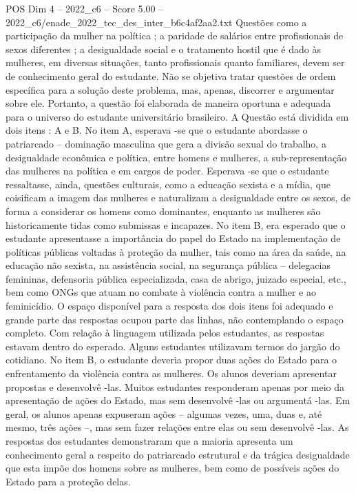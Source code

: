 \begin{textsample}{POS Dim 4 – 2022\_c6 – Score 5.00 – 2022\_c6/enade\_2022\_tec\_des\_inter\_b6c4af2aa2.txt}
Questões como a participação da mulher na política ; a paridade de salários entre profissionais de sexos diferentes ; a desigualdade social e o tratamento hostil que é dado às mulheres, em diversas situações, tanto profissionais quanto familiares, devem ser de conhecimento geral do estudante.
Não se objetiva tratar questões de ordem específica para a solução deste problema, mas, apenas, discorrer e argumentar sobre ele.
Portanto, a questão foi elaborada de maneira oportuna e adequada para o universo do estudante universitário brasileiro.
A Questão está dividida em dois itens : A e B.
No item A, esperava -se que o estudante abordasse o patriarcado – dominação masculina que gera a divisão sexual do trabalho, a desigualdade econômica e política, entre homens e mulheres, a sub-representação das mulheres na política e em cargos de poder.
Esperava -se que o estudante ressaltasse, ainda, questões culturais, como a educação sexista e a mídia, que coisificam a imagem das mulheres e naturalizam a desigualdade entre os sexos, de forma a considerar os homens como dominantes, enquanto as mulheres são historicamente tidas como submissas e incapazes.
No item B, era esperado que o estudante apresentasse a importância do papel do Estado na implementação de políticas públicas voltadas à proteção da mulher, tais como na área da saúde, na educação não sexista, na assistência social, na segurança pública – delegacias femininas, defensoria pública especializada, casa de abrigo, juizado especial, etc., bem como ONGs que atuam no combate à violência contra a mulher e ao feminicídio.
O espaço disponível para a resposta dos dois itens foi adequado e grande parte das respostas ocupou parte das linhas, não contemplando o espaço completo.
Com relação à linguagem utilizada pelos estudantes, as respostas estavam dentro do esperado.
Alguns estudantes utilizavam termos do jargão do cotidiano.
No item B, o estudante deveria propor duas ações do Estado para o enfrentamento da violência contra as mulheres.
Os alunos deveriam apresentar propostas e desenvolvê -las.
Muitos estudantes responderam apenas por meio da apresentação de ações do Estado, mas sem desenvolvê -las ou argumentá -las.
Em geral, os alunos apenas expuseram ações – algumas vezes, uma, duas e, até mesmo, três ações –, mas sem fazer relações entre elas ou sem desenvolvê -las.
As respostas dos estudantes demonstraram que a maioria apresenta um conhecimento geral a respeito do patriarcado estrutural e da trágica desigualdade que esta impõe dos homens sobre as mulheres, bem como de possíveis ações do Estado para a proteção delas.

\end{textsample}
